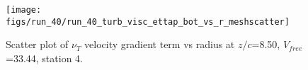 \begin{figure}[H]
\centering
\texttt{[image: figs/run\_40/run\_40\_turb\_visc\_ettap\_bot\_vs\_r\_meshscatter]}
\caption{Scatter plot of $\nu_T$ velocity gradient term vs radius at $z/c$=8.50, $V_{free}$=33.44, station 4.}
\label{fig:run_40_turb_visc_ettap_bot_vs_r_meshscatter}
\end{figure}



